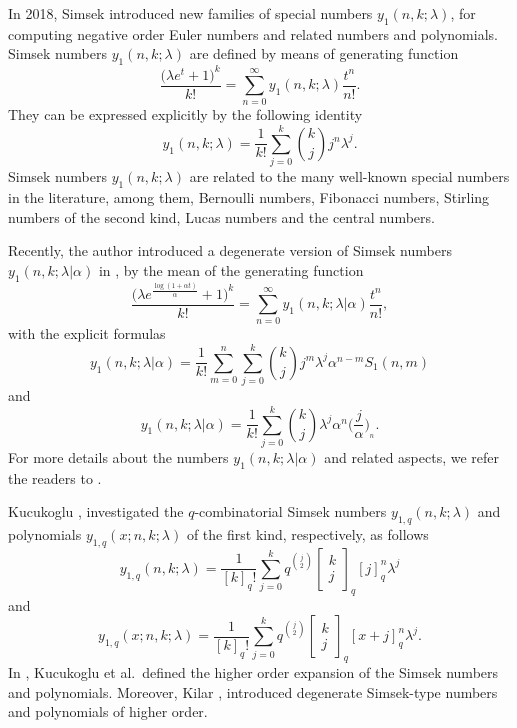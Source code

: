\documentclass{amsart}
\numberwithin{equation}{section}
\theoremstyle{definition}
\theoremstyle{remark}
\begin{document}
In 2018, Simsek \cite{YS1018} introduced new families of special numbers $y_{1}(n,k;\lambda)$, for computing negative order Euler numbers and related numbers and polynomials. Simsek numbers $y_{1}(n,k;\lambda)$ are defined  by means of generating function 
\begin{equation}\label{Snumbers}
  \frac{\Big(\lambda e^t+1\Big)^k}{k!}=\sum_{n=0}^{\infty}y_{1}(n,k;\lambda)\frac{t^n}{n!}.  
\end{equation}
They can be expressed explicitly by the following identity
\begin{equation}\label{SnumbersExp}
   y_{1}(n,k;\lambda)=\frac{1}{k!}\sum_{j=0}^{k}\binom{k}{j} j^n\lambda^j.
\end{equation}
Simsek numbers $y_{1}(n,k;\lambda)$ are related to the many well-known special numbers in the literature, among them, Bernoulli
numbers, Fibonacci numbers, Stirling numbers of the second kind, Lucas numbers and the central numbers. 

Recently, the author introduced a degenerate version of Simsek numbers $y_{1}(n,k;\lambda|\alpha)$ in \cite{LO2023}, by the mean of the generating function 
\begin{equation}\label{DSnumbers}
 \frac{\Big(\lambda e^{\frac{\log(1+\alpha t)}{\alpha}}+1\Big)^k}{k!}=\sum_{n=0}^{\infty}y_{1}(n,k;\lambda|\alpha)\frac{t^n}{n!}, 
\end{equation}
with the explicit formulas
\begin{equation}\label{expformdS1}
   y_{1}(n,k;\lambda|\alpha)=\frac{1}{k!}\sum_{m=0}^{n}\sum_{j=0}^{k} \binom{k}{j}j^m\lambda^j\alpha^{n-m}S_1(n,m)
\end{equation}
and
\begin{equation}\label{expformdS2}
   y_{1}(n,k;\lambda|\alpha)=\frac{1}{k!}\sum_{j=0}^{k} \binom{k}{j}\lambda^j\alpha^{n}\Big(\frac{j}{\alpha}\Big)_{_{n}}.
\end{equation}
For more details about the numbers $y_{1}(n,k;\lambda|\alpha)$ and related aspects, we refer the readers to \cite{LO2023}.

Kucukoglu \cite{IK2025, IK2023}, investigated the $q$-combinatorial Simsek numbers  $y_{1,q}(n,k;\lambda)$ and polynomials  $y_{1,q}(x;n,k;\lambda)$ of the first kind, respectively, as follows
$$y_{1,q}(n,k;\lambda)=\frac{1}{[k]_q!}\sum_{j=0}^{k}q^{\binom{j}{2}}\begin{bmatrix}
k \\
j 
\end{bmatrix}_{q}[j]_{q}^{n}\lambda^j$$
and 
$$y_{1,q}(x;n,k;\lambda)=\frac{1}{[k]_q!}\sum_{j=0}^{k}q^{\binom{j}{2}}\begin{bmatrix}
k \\
j 
\end{bmatrix}_{q}[x+j]_{q}^{n}\lambda^j.$$
In \cite{IKBSYS2019}, Kucukoglu et al.~defined the higher order expansion of the Simsek numbers and polynomials. Moreover, Kilar \cite{NK2024}, introduced degenerate Simsek-type numbers and polynomials of higher order. 
 
\end{document}
